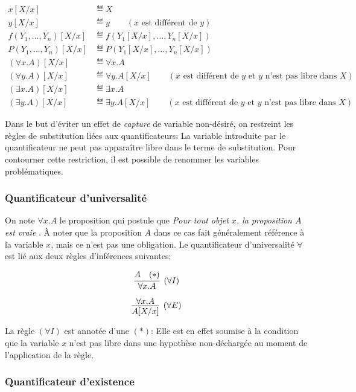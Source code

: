 \begin{align*}
x[X / x] &\eqdef X \\
y[X / x] &\eqdef y \hspace{2em} (x \text{ est différent de } y)\\
f(Y_1, \dots, Y_n)[X / x] &\eqdef f(Y_1[X / x], \dots, Y_n[X / x])\\
P(Y_1, \dots, Y_n)[X / x] &\eqdef P(Y_1[X / x], \dots, Y_n[X / x])\\
(\forall x. A)[X / x] &\eqdef \forall x. A\\
(\forall y. A)[X / x] &\eqdef \forall y. A[X / x] \hspace{2em} (x \text{ est différent de } y \text{ et $y$ n'est pas libre dans $X$})\\
(\exists x. A)[X / x] &\eqdef \exists x. A\\
(\exists y. A)[X / x] &\eqdef \exists y. A[X / x] \hspace{2em} (x \text{ est différent de } y \text{ et $y$ n'est pas libre dans $X$})
\end{align*}

Dans le but d'éviter un effet de \textit{capture} de variable non-désiré, on restreint les règles de substitution liées aux quantificateurs:
La variable introduite par le quantificateur ne peut pas apparaître libre dans le terme de substitution.
Pour contourner cette restriction, il est possible de renommer les variables problématiques.

\subsubsection{Quantificateur d'universalité}

On note $\forall x. A$ le proposition qui postule que \og \textit{Pour tout objet $x$, la proposition $A$ est vraie} \fg{}.
À noter que la proposition $A$ dans ce cas fait généralement référence à la variable $x$, mais ce n'est pas une obligation.
Le quantificateur d'universalité $\forall$ est lié aux deux règles d'inférences suivantes:

\[
\infer[({\forall}I)]{\forall x. A}{A & (*)}
\]

\[
\infer[({\forall}E)]{A[X / x]}{\forall x. A}
\]

La règle $({\forall}I)$ est annotée d'une $(*)$: Elle est en effet soumise à la condition que la variable $x$ n'est pas libre dans une hypothèse non-déchargée au moment de l'application de la règle.

\subsubsection{Quantificateur d'existence}

